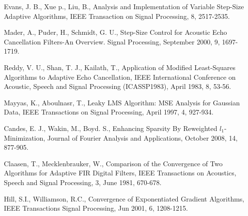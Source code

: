%
Evans, J. B., Xue p., Liu, B., Analysis and Implementation of Variable Step-Size Adaptive Algorithms, IEEE Transaction on Signal Processing, 8, 2517-2535.

%
Mader, A., Puder, H., Schmidt, G. U., Step-Size Control for Acoustic Echo Cancellation Filters-An Overview. Signal Processing, September 2000, 9, 1697-1719.



%
Reddy, V. U., Shan, T. J., Kailath, T., Application of Modified Least-Squares Algorithms to Adaptive Echo Cancellation, IEEE International Conference on  Acoustic, Speech and Signal Processing (ICASSP1983), April 1983, 8, 53-56.




%
Mayyas, K., Aboulnasr, T., Leaky LMS Algorithm: MSE Analysis for Gaussian Data, IEEE Transactions on Signal Processing, April 1997, 4, 927-934.

%
Candes, E. J., Wakin, M., Boyd. S., Enhancing Sparsity By Reweighted $l_1$-Minimization, Journal of Fourier Analysis and Applications, October 2008, 14, 877-905.
%


%
Claasen, T., Mecklenbrauker, W., Comparison of the Convergence of Two Algorithms for Adaptive FIR Digital Filters, IEEE Transactions on Acoustics, Speech and Signal Processing, 3, June 1981, 670-678.

%
Hill, S.I., Williamson, R.C., Convergence of Exponentiated Gradient Algorithms, IEEE Transactions Signal Processing, Jun 2001, 6, 1208-1215.




































